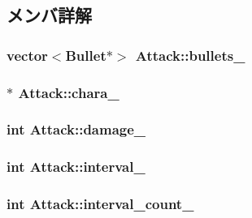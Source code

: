 \subsection{メンバ詳解}
\hypertarget{class_attack_a4cacf753c3dd709aa9d09260f526213c}{
\subsubsection[{bullets\+\_\+}]{\setlength{\rightskip}{0pt plus 5cm}vector$<${\bf Bullet}$\ast$$>$ Attack\+::bullets\+\_\+\hspace{0.3cm}{\ttfamily [protected]}}}\label{class_attack_a4cacf753c3dd709aa9d09260f526213c}
\hypertarget{class_attack_a483c58b104388d57b0f9b380897a49c3}{
\subsubsection[{chara\+\_\+}]{$\ast$ Attack\+::chara\+\_\+\hspace{0.3cm}{\ttfamily [protected]}}}\label{class_attack_a483c58b104388d57b0f9b380897a49c3}
\hypertarget{class_attack_a2bfc44a2d532e0c38fa57c53e57e2995}{
\subsubsection[{damage\+\_\+}]{\setlength{\rightskip}{0pt plus 5cm}int Attack\+::damage\+\_\+\hspace{0.3cm}{\ttfamily [protected]}}}\label{class_attack_a2bfc44a2d532e0c38fa57c53e57e2995}
\hypertarget{class_attack_a80bac689222ec4b3aa22691fe7b01380}{
\subsubsection[{interval\+\_\+}]{\setlength{\rightskip}{0pt plus 5cm}int Attack\+::interval\+\_\+\hspace{0.3cm}{\ttfamily [protected]}}}\label{class_attack_a80bac689222ec4b3aa22691fe7b01380}
\hypertarget{class_attack_a6fa9915c652fa7b30a80382b81cd9c1e}{
\subsubsection[{interval\+\_\+count\+\_\+}]{\setlength{\rightskip}{0pt plus 5cm}int Attack\+::interval\+\_\+count\+\_\+\hspace{0.3cm}{\ttfamily [protected]}}}\label{class_attack_a6fa9915c652fa7b30a80382b81cd9c1e}
